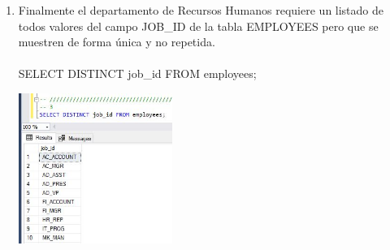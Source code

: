 \begin{enumerate}[1.]
	\item Finalmente el departamento de Recursos Humanos requiere un listado de todos valores del campo JOB\_ID de la tabla EMPLOYEES pero que se muestren de forma única y no repetida.
	\\
	\\SELECT DISTINCT job\_id FROM employees; 

	\begin{center}
	\includegraphics[width=5cm]{./Imagenes/actividad0203} 
	\end{center}

\end{enumerate}



